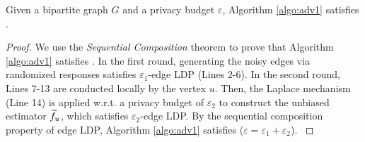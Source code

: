 \begin{theorem} 
{Given a bipartite graph $G$ and a privacy budget $\varepsilon$, Algorithm \ref{algo:adv1} satisfies \epldp. }
\end{theorem} 
\begin{proof}
{
We use the {\em Sequential Composition} theorem \cite{jiang2021applications} to prove that Algorithm \ref{algo:adv1} satisfies \epldp. 
In the first round, generating the noisy edges via randomized responses satisfies $\varepsilon_1$-edge LDP (Lines 2-6). 
In the second round, Lines 7-13 are conducted locally by the vertex $u$. 
Then, the Laplace mechanism (Line 14) is applied w.r.t. a privacy budget of $\varepsilon_2$ to construct the unbiased estimator $\widetilde{f}_u$, which satisfies $\varepsilon_2$-edge LDP. 
By the sequential composition property of edge LDP, Algorithm \ref{algo:adv1} satisfies \epldp ($\varepsilon = \varepsilon_1 + \varepsilon_2$). }
\end{proof}
